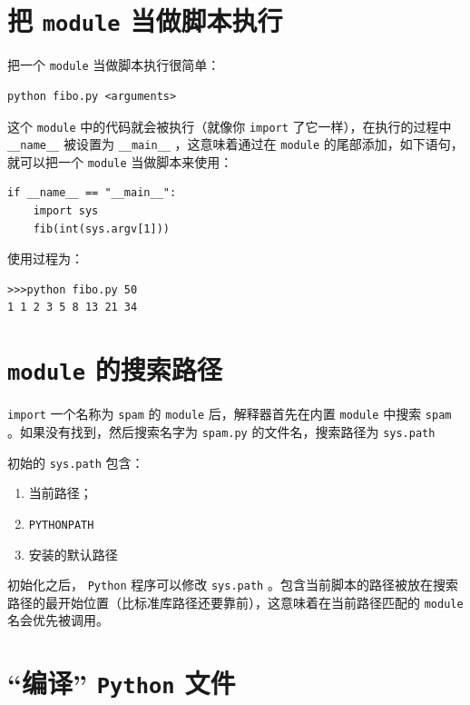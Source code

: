 \documentclass[10pt,a4paper,UTF8]{article}
\begin{document}
\section{把 \texttt{module} 当做脚本执行}
\label{sec:org4b564c7}


把一个 \texttt{module} 当做脚本执行很简单：
\begin{verbatim}
python fibo.py <arguments>
\end{verbatim}

这个 \texttt{module} 中的代码就会被执行（就像你 \texttt{import} 了它一样），在执行的过程中 \texttt{\_\_name\_\_} 被设置为 \texttt{\_\_main\_\_} ，这意味着通过在 \texttt{module} 的尾部添加，如下语句，就可以把一个 \texttt{module} 当做脚本来使用：
\lstset{language=Python,label= ,caption= ,captionpos=b,numbers=none}
\begin{lstlisting}
if __name__ == "__main__":
    import sys
    fib(int(sys.argv[1]))
\end{lstlisting}

使用过程为：
\begin{verbatim}
>>>python fibo.py 50
1 1 2 3 5 8 13 21 34
\end{verbatim}

\section{\texttt{module} 的搜索路径}
\label{sec:orge969924}


\texttt{import} 一个名称为 \texttt{spam} 的 \texttt{module} 后，解释器首先在内置 \texttt{module} 中搜索 \texttt{spam} 。如果没有找到，然后搜索名字为 \texttt{spam.py} 的文件名，搜索路径为 \texttt{sys.path} 

初始的 \texttt{sys.path} 包含：
\begin{enumerate}
\item 当前路径；
\item \texttt{PYTHONPATH}
\item 安装的默认路径
\end{enumerate}

初始化之后， \texttt{Python} 程序可以修改 \texttt{sys.path} 。包含当前脚本的路径被放在搜索路径的最开始位置（比标准库路径还要靠前），这意味着在当前路径匹配的 \texttt{module} 名会优先被调用。

\section{“编译” \texttt{Python} 文件}
\label{sec:orgfa198a3}
\end{document}
